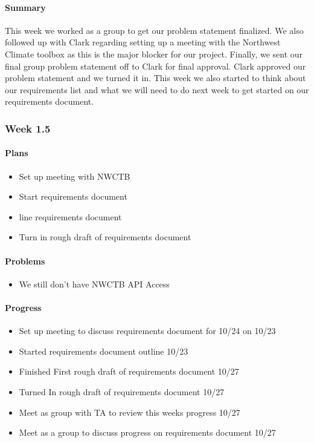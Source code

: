 \documentclass[onecolumn, draftclsnofoot,10pt, compsoc]{article}
\begin{document}
		        \paragraph{Summary}
		            This week we worked as a group to get our problem statement finalized. We also followed up with Clark regarding setting up a meeting with the Northwest Climate toolbox as this is the major blocker for our project. Finally, we sent our final group problem statement off to Clark for final approval. Clark approved our problem statement and we turned it in. This week we also started to think about our requirements list and what we will need to do next week to get started on our requirements document.\\

		\subsubsection{Week 1.5}
			\paragraph{Plans} \hfill \break

		        \begin{itemize}
		            \item Set up meeting with NWCTB
		            \item Start requirements document
		            \item line requirements document
		            \item Turn in rough draft of requirements document
		        \end{itemize}

		    \paragraph{Problems} \hfill \break
		        \begin{itemize}
		            \item We still don't have NWCTB API Access
		        \end{itemize}

		    \paragraph{Progress} \hfill \break

		    \begin{itemize}
		        \item Set up meeting to discuss requirements document for 10/24 on 10/23
		        \item Started requirements document outline 10/23
		        \item Finished First rough draft of requirements document 10/27
		        \item Turned In rough draft of requirements document 10/27
		        \item Meet as group with TA to review this weeks progress 10/27
		        \item Meet as a group to discuss progress on requirements document 10/27
		    \end{itemize}
\end{document}
